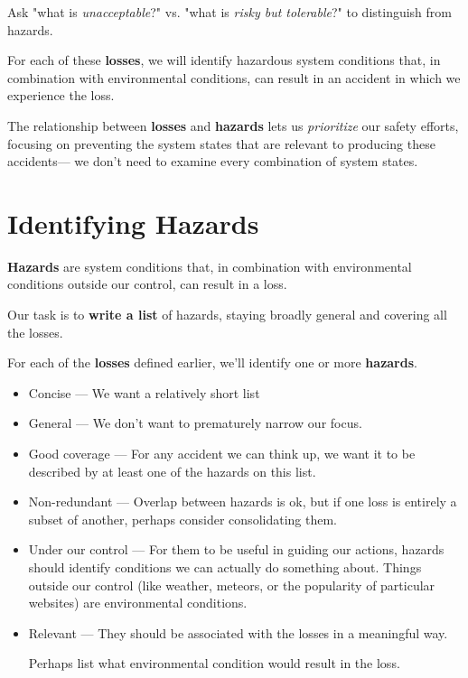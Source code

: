 \documentclass[letterpaper]{tufte-book}
\begin{document}

Ask "what is \emph{unacceptable}?" vs. "what is \emph{risky but tolerable}?" to distinguish from hazards.


For each of these \textbf{losses}, we will identify hazardous system conditions that, in combination with environmental conditions, can result in an accident in which we experience the loss.

The relationship between \textbf{losses} and \textbf{hazards} lets us \emph{prioritize} our safety efforts, focusing on preventing the system states that are relevant to producing these accidents--- we don't need to examine every combination of system states.
 
\newtheorem{example}{Ex}

\setlength{\parindent}{0em}
\setlength{\parskip}{.75em}

\section{Identifying Hazards}


\textbf{Hazards} are system conditions that, in combination with environmental conditions outside our control, can result in a loss.

Our task is to \textbf{write a list} of hazards, staying broadly general and covering all the losses.

For each of the \textbf{losses} defined earlier, we'll identify one or more \textbf{hazards}. 







\begin{itemize}
\setlength{\itemsep}{0pt}
\setlength{\parskip}{.25em}
\item Concise --- We want a relatively short list
\item General --- We don't want to prematurely narrow our focus. 
\item Good coverage --- For any accident we can think up, we want it to be described by at least one of the hazards on this list.
\item Non-redundant --- Overlap between hazards is ok, but if one loss is entirely a subset of another, perhaps consider consolidating them.
\item Under our control --- For them to be useful in guiding our actions, hazards should identify conditions we can actually do something about. Things outside our control (like weather, meteors, or the popularity of particular websites) are environmental conditions.
\item Relevant --- They should be associated with the losses in a meaningful way. 

Perhaps list what environmental condition would result in the loss.
\end{itemize}  
 
\end{document}
